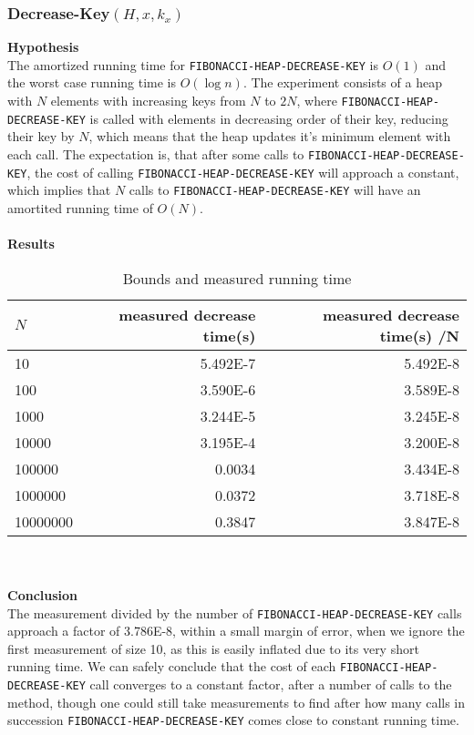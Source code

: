 \documentclass[a4paper,10pt]{article}
\begin{document}
\subsubsection{Decrease-Key$(H,x,k_x)$}
{\bf Hypothesis}\\
The amortized running time for \texttt{FIBONACCI-HEAP-DECREASE-KEY} is $O(1)$ and the worst case running time is $O(\log n)$. The experiment consists of a heap with $N$ elements with increasing keys from $N$ to $2N$, where \texttt{FIBONACCI-HEAP-DECREASE-KEY} is called with elements in decreasing order of their key, reducing their key by $N$, which means that the heap updates it's minimum element with each call. The expectation is, that after some calls to \texttt{FIBONACCI-HEAP-DECREASE-KEY}, the cost of calling \texttt{FIBONACCI-HEAP-DECREASE-KEY} will approach a constant, which implies that $N$ calls to \texttt{FIBONACCI-HEAP-DECREASE-KEY} will have an amortited running time of $O(N)$.\\\\
{\bf Results}
\begin{table}
  \begin{center}
    \begin{tabular}{l|r|r}
      $N$ & measured decrease time(s) & measured decrease time(s) /N \\
      \hline
      10       & \num{5.492E-7}     & \num{5.492E-8}\\
      100      & \num{3.590E-6}     & \num{3.589E-8}\\
      1000     & \num{3.244E-5}     & \num{3.245E-8}\\
      10000    & \num{3.195E-4}     & \num{3.200E-8}\\
      100000   & \num{0.0034}       & \num{3.434E-8}\\
      1000000  & \num{0.0372}       & \num{3.718E-8}\\
      10000000 & \num{0.3847}       & \num{3.847E-8}
    \end{tabular}
    \caption{Bounds and measured running time}
  \end{center}
\end{table}\\\\
{\bf Conclusion}\\
The measurement divided by the number of \texttt{FIBONACCI-HEAP-DECREASE-KEY} calls approach a factor of \num{3.786E-8}, within a small margin of error, when we ignore the first measurement of size 10, as this is easily inflated due to its very short running time. We can safely conclude that the cost of each \texttt{FIBONACCI-HEAP-DECREASE-KEY} call converges to a constant factor, after a number of calls to the method, though one could still take measurements to find after how many calls in succession \texttt{FIBONACCI-HEAP-DECREASE-KEY} comes close to constant running time.
\end{document}
